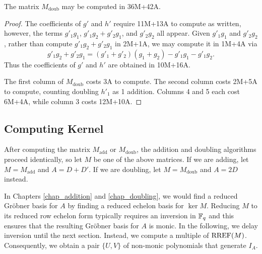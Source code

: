 \begin{lemma}
  The matrix $M_{\text{doub}}$ may be computed in 36M+42A.
\end{lemma}
\begin{proof}
  The coefficients of $g'$ and $h'$ require 11M+13A to compute as written,
  however, the terms $g'_1g_1$, $g'_1g_2 + g'_2g_1$, and $g'_2g_2$ all appear.
  Given $g'_1g_1$ and $g'_2g_2$, rather than compute $g'_1g_2 + g'_2g_1$ in 2M+1A,
  we may compute it in 1M+4A via
  \[ g'_1g_2 + g'_2g_1 = (g'_1 + g'_2)(g_1 + g_2) - g'_1g_1 - g'_1g_2. \]
  Thus the coefficients of $g'$ and $h'$ are obtained in 10M+16A.
  
  The first column of $M_{\text{doub}}$ costs 3A to compute.
  The second column costs 2M+5A to compute, counting doubling $h'_1$ as 1 addition.
  Columns 4 and 5 each cost 6M+4A, while column 3 costs 12M+10A.
\end{proof}




\subsection{Computing Kernel}

After computing the matrix $M_{\text{add}}$ or $M_{\text{doub}}$,
the addition and doubling algorithms proceed identically,
so let $M$ be one of the above matrices.
If we are adding, let $M = M_{\text{add}}$ and $A = D + D'$.
If we are doubling, let $M = M_{\text{doub}}$ and $A = 2D$ instead.

In Chapters \ref{chap_addition} and \ref{chap_doubling},
we would find a reduced Gr\"obner basis for $A$ by finding a reduced echelon basis for $\ker M$.
Reducing $M$ to its reduced row echelon form typically requires an inversion in $\mathbb{F}_q$
and this ensures that the resulting Gr\"obner basis for $A$ is monic.
In the following, we delay inversion until the next section.
Instead, we compute a multiple of $\operatorname{RREF}(M)$.
Consequently, we obtain a pair $\{U,V\}$ of non-monic polynomials that generate $I_A$.

